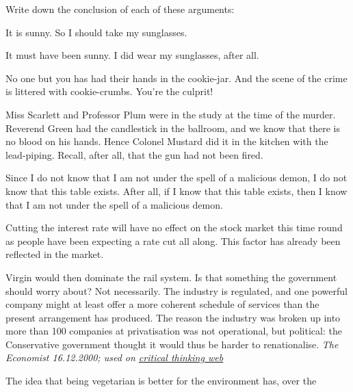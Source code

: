 \problempart
Write down the conclusion of each of these arguments:
\begin{earg}
	\item It is sunny. So I should take my sunglasses.
	\item It must have been sunny. I did wear my sunglasses, after all.
	\item No one but you has had their hands in the cookie-jar. And the scene of the crime is littered with cookie-crumbs. You're the culprit!
	\item Miss Scarlett and Professor Plum were in the study at the time of the murder. Reverend Green had the candlestick in the ballroom, and we know that there is no blood on his hands. Hence Colonel Mustard did it in the kitchen with the lead-piping. Recall, after all, that the gun had not been fired.
	\item  Since I do not know that I am not under the spell of a malicious demon, I do not know that this table exists. After all, if I know that this table exists, then I know that I am not under the spell of a malicious demon. 
	\item Cutting the interest rate will have no effect on the stock market this time round as people have been expecting a rate cut all along. This factor has already been reflected in the market.
	\item Virgin would then dominate the rail system. Is that something the government should worry about? Not necessarily. The industry is regulated, and one powerful company might at least offer a more coherent schedule of services than the present arrangement has produced. The reason the industry was broken up into more than 100 companies at privatisation was not operational, but political: the Conservative government thought it would thus be harder to renationalise. \emph{The Economist 16.12.2000; used on \href{https://philosophy.hku.hk/think/arg/arg.php}{critical thinking web}}
	\item The idea that being vegetarian is better for the environment has, over the

\end{earg}
